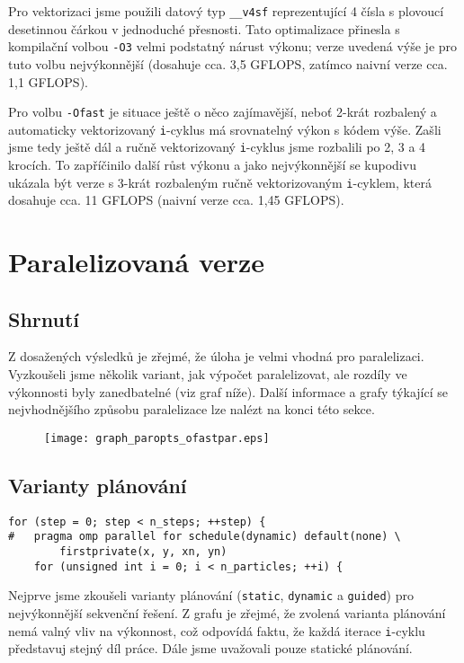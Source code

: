 \documentclass[10pt,a4paper]{article}
\begin{document}
Pro vektorizaci jsme použili datový typ \texttt{\_\_v4sf} reprezentující
4 čísla s plovoucí desetinnou čárkou v jednoduché přesnosti. Tato optimalizace
přinesla s kompilační volbou \texttt{-O3} velmi podstatný nárust výkonu; verze
uvedená výše je pro tuto volbu nejvýkonnější (dosahuje cca. 3,5 GFLOPS, zatímco
naivní verze cca. 1,1 GFLOPS).

Pro volbu \texttt{-Ofast} je situace ještě o něco zajímavější, neboť
2-krát rozbalený a automaticky vektorizovaný \texttt{i}-cyklus má
srovnatelný výkon s kódem výše. Zašli jsme tedy ještě dál a ručně
vektorizovaný \texttt{i}-cyklus jsme rozbalili po 2, 3 a 4 krocích. To
zapříčinilo další růst výkonu a jako nejvýkonnější se kupodivu ukázala
být verze s 3-krát rozbaleným ručně vektorizovaným \texttt{i}-cyklem,
která dosahuje cca. 11 GFLOPS (naivní verze cca. 1,45 GFLOPS).

\pagebreak
\section{Paralelizovaná verze}

\subsection{Shrnutí}
Z dosažených výsledků je zřejmé, že úloha je velmi vhodná pro
paralelizaci.  Vyzkoušeli jsme několik variant, jak výpočet
paralelizovat, ale rozdíly ve výkonnosti byly zanedbatelné (viz graf
níže). Další informace a grafy týkající se nejvhodnějšího způsobu
paralelizace lze nalézt na konci této sekce.

\begin{figure}[h!]
    \centering
    \texttt{[image: graph\_paropts\_ofastpar.eps]}
    \label{fig:3}
\end{figure}

\subsection{Varianty plánování}
\begin{lstlisting}
for (step = 0; step < n_steps; ++step) {
#   pragma omp parallel for schedule(dynamic) default(none) \
        firstprivate(x, y, xn, yn)
    for (unsigned int i = 0; i < n_particles; ++i) {
\end{lstlisting}

Nejprve jsme zkoušeli varianty plánování (\texttt{static},
\texttt{dynamic} a \texttt{guided}) pro nejvýkonnější sekvenční
řešení. Z grafu je zřejmé, že zvolená varianta plánování nemá valný
vliv na výkonnost, což odpovídá faktu, že každá iterace
\texttt{i}-cyklu představuj stejný díl práce. Dále jsme uvažovali
pouze statické plánování.
\end{document}
